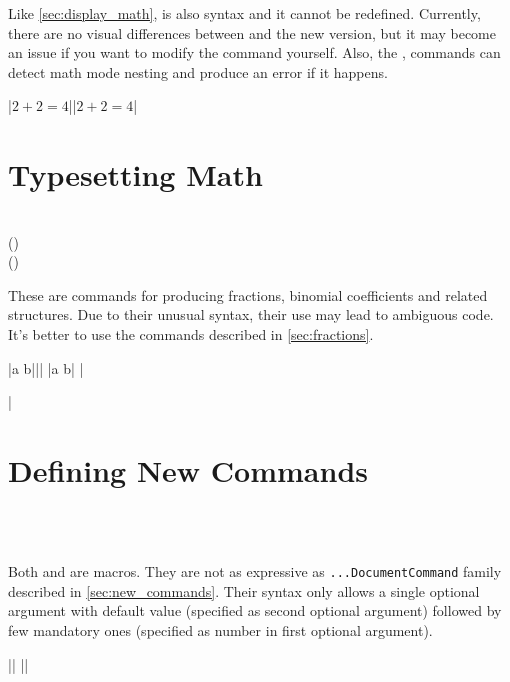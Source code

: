 Like \autoref{sec:display_math}, \ai{\$} is also  syntax
and it cannot be redefined. Currently, there are no visual differences between
\ai{\$} and the new version, but it may become an
issue if you want to modify the command yourself. Also, the \csi{(}, \csi{)} commands
can detect math mode nesting and produce an error if it happens.

\chto|$ 2 + 2 = 4 $||\( 2 + 2 = 4 \)|

\section{Typesetting Math}
 {
   \\
   () \\
   ()
}

These are  commands for producing fractions, binomial
coefficients and related structures. Due to their unusual syntax, their use may
lead to ambiguous code. It's better to use the commands described in
\autoref{sec:fractions}.
\begin{chktexignore}
\chto|{a \over b}|||
\chto|{a \choose b}|
|\usepackage{amsmath}
|
\end{chktexignore}

\section{Defining New Commands}\label{sec:def}
 {
   \\
   \\
}

Both  and  are  macros. They
are not as expressive as \texttt{...DocumentCommand} family
described in \autoref{sec:new_commands}. Their syntax only allows a single
optional argument with default value (specified as second optional argument)
followed by few mandatory ones (specified as number in first optional
argument).
\begin{chktexignore}
  \vchto|\newcommand{\foo}[4][bar]{ ... }|
  ||
\end{chktexignore}

